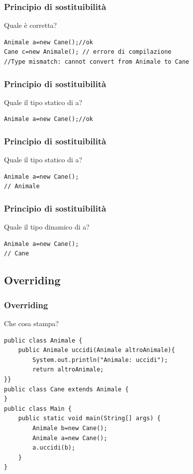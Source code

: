 \documentclass{beamer}
\begin{document}
\begin{frame}[fragile]
\frametitle{Principio di sostituibilit\`a}
Quale \`e corretta?
\begin{framed}
\begin{lstlisting}
Animale a=new Cane();//ok
Cane c=new Animale(); // errore di compilazione
//Type mismatch: cannot convert from Animale to Cane
\end{lstlisting}
\end{framed}
\end{frame}

\begin{frame}[fragile]
\frametitle{Principio di sostituibilit\`a}
Quale il tipo statico di a? 
\begin{framed}
\begin{lstlisting}
Animale a=new Cane();//ok
\end{lstlisting}
\end{framed}
\end{frame}

\begin{frame}[fragile]
\frametitle{Principio di sostituibilit\`a}
Quale il tipo statico di a? 
\begin{framed}
\begin{lstlisting}
Animale a=new Cane();
// Animale
\end{lstlisting}
\end{framed}
\end{frame}

\begin{frame}[fragile]
\frametitle{Principio di sostituibilit\`a}
Quale il tipo dinamico di a? 
\begin{framed}
\begin{lstlisting}
Animale a=new Cane();
// Cane
\end{lstlisting}
\end{framed}
\end{frame}


\subsection{Overriding}
\begin{frame}[fragile]
\frametitle{Overriding}
\begin{framed}
Che cosa stampa?
\begin{lstlisting}
public class Animale {
    public Animale uccidi(Animale altroAnimale){
        System.out.println("Animale: uccidi");
        return altroAnimale;
}}
public class Cane extends Animale {
}
public class Main {
    public static void main(String[] args) {
        Animale b=new Cane();
        Animale a=new Cane();
        a.uccidi(b);
    }
}
\end{lstlisting}
\end{framed}
\end{frame}
\end{document}
